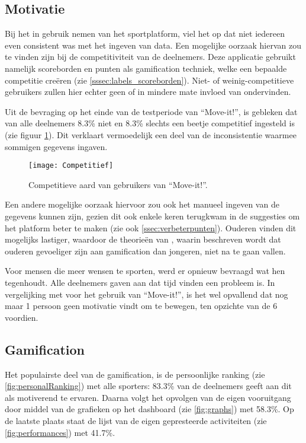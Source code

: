 \subsection{Motivatie}

Bij het in gebruik nemen van het sportplatform, viel het op dat niet iedereen even consistent was met het ingeven van data. Een mogelijke oorzaak hiervan zou te vinden zijn bij de competitiviteit van de deelnemers. Deze applicatie gebruikt namelijk scoreborden en punten als gamification techniek, welke een bepaalde competitie creëren (zie \ref{sssec:labels_scoreborden}). Niet- of weinig-competitieve gebruikers zullen hier echter geen of in mindere mate invloed van ondervinden.

Uit de bevraging op het einde van de testperiode van ``Move-it!'', is gebleken dat van alle deelnemers 8.3\% niet en 8.3\% slechts een beetje competitief ingesteld is (zie figuur \ref{fig:competitief}). Dit verklaart vermoedelijk een deel van de inconsistentie waarmee sommigen gegevens ingaven.

\begin{figure}[h]
    \caption[Competitieve aard van gebruikers van ``Move-it!'']{Competitieve aard van gebruikers van ``Move-it!''.}
    \texttt{[image: Competitief]}
    \label{fig:competitief}
\end{figure}

Een andere mogelijke oorzaak hiervoor zou ook het manueel ingeven van de gegevens kunnen zijn, gezien dit ook enkele keren terugkwam in de suggesties om het platform beter te maken (zie ook \ref{ssec:verbeterpunten}).
Ouderen vinden dit mogelijks lastiger, waardoor de theorieën van \textcite{PoloPena2020}, waarin beschreven wordt dat ouderen gevoeliger zijn aan gamification dan jongeren, niet na te gaan vallen.

Voor mensen die meer wensen te sporten, werd er opnieuw bevraagd wat hen tegenhoudt. Alle deelnemers gaven aan dat tijd vinden een probleem is. In vergelijking met voor het gebruik van ``Move-it!'', is het wel opvallend dat nog maar 1 persoon geen motivatie vindt om te bewegen, ten opzichte van de 6 voordien.

\subsection{Gamification}

Het populairste deel van de gamification, is de persoonlijke ranking (zie \ref{fig:personalRanking}) met alle sporters: 83.3\% van de deelnemers geeft aan dit als motiverend te ervaren.
Daarna volgt het opvolgen van de eigen vooruitgang door middel van de grafieken op het dashboard (zie \ref{fig:graphs}) met 58.3\%.
Op de laatste plaats staat de lijst van de eigen gepresteerde activiteiten (zie \ref{fig:performances}) met 41.7\%.

